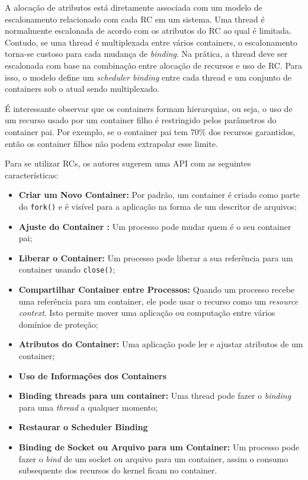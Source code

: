 A alocação de atributos está diretamente associada com um modelo de
escalonamento relacionado com cada RC em um sistema. Uma thread é normalmente
escalonada de acordo com os atributos do RC ao qual é limitada. Contudo, se uma
thread é multiplexada entre vários containers, o escalonamento torna-se custoso
para cada mudança de \textit{binding}. Na prática, a thread deve ser escalonada com base
na combinação entre alocação de recursos e uso de RC. Para isso, o modelo
define um \emph{scheduler binding} entre cada thread e um conjunto de containers
sob o atual sendo multiplexado. 

É interessante observar que os containers formam hierarquias, ou seja, o uso de
um recurso usado por um container filho é restringido pelos parâmetros do
container pai. Por exemplo, se o container pai tem 70\% dos recursos
garantidos, então os container filhos não podem extrapolar esse limite.

Para se utilizar RCs, os autores sugerem uma API com as
seguintes características:

\begin{itemize}
	\item \textbf{Criar um Novo Container:} Por padrão, um container é criado
				como parte do \texttt{fork()} e é visível para a aplicação na forma
				de um descritor de arquivos;
	\item \textbf{Ajuste do Container :} Um processo pode mudar quem é o seu
				container pai;
	\item \textbf{Liberar o Container:} Um processo pode liberar a sua referência
				para um container usando \texttt{close()};
	\item \textbf{Compartilhar Container entre Processos:} Quando um processo
				recebe uma referência para um container, ele pode usar o recurso como
				um \emph{resource context}. Isto permite mover uma aplicação ou
				computação entre vários domínios de proteção;
	\item \textbf{Atributos do Container:} Uma aplicação pode ler e ajustar
				atributos de um container;
	\item \textbf{Uso de Informações dos Containers}
	\item \textbf{Binding threads para um container:} Uma thread pode fazer o
		\emph{binding} para uma \emph{thread} a qualquer momento;
	\item \textbf{Restaurar o Scheduler Binding}
	\item \textbf{Binding de Socket ou Arquivo para um Container:} Um processo
				pode fazer o \emph{bind} de um socket ou arquivo para um container,
				assim o consumo subsequente dos recursos do kernel ficam no container.
\end{itemize}

